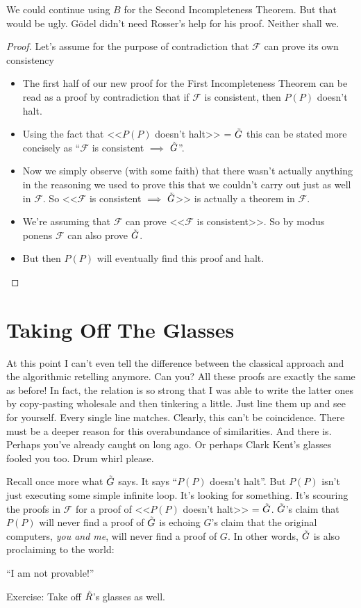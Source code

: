 \documentclass{article}
\newcommand{\F}{\ensuremath{\mathcal{F}}}
\newcommand{\iGoedel}{\ensuremath{\accentset{\scalebox{0.35}{$\infty$}}{G}}}
\newcommand{\iRosser}{\ensuremath{\accentset{\scalebox{0.35}{$\infty$}}{R}}}
\begin{document}
We could continue using $B$ for the Second Incompleteness Theorem. But that would be ugly. Gödel didn't need Rosser's help for his proof. Neither shall we.

\begin{proof}
Let's assume for the purpose of contradiction that $\F$ can prove its own consistency
\begin{itemize}
\item The first half of our new proof for the First Incompleteness Theorem can be read as a proof by contradiction that if $\F$ is consistent, then $P(P)$ doesn't halt.
\item Using the fact that <<$P(P)$ doesn't halt>> = $\iGoedel$ this can be stated more concisely as ``$\F$ is consistent $\implies$ $\iGoedel$''.
\item Now we simply observe (with some faith) that there wasn't actually anything in the reasoning we used to prove this that we couldn't carry out just as well in $\F$. So <<$\F$ is consistent $\implies$ $\iGoedel$>> is actually a theorem in $\F$.
\item We're assuming that $\F$ can prove <<$\F$ is consistent>>. So by modus ponens $\F$ can also prove $\iGoedel$.
\item But then $P(P)$ will eventually find this proof and halt. \lightning
\end{itemize}
\end{proof}

\section{Taking Off The Glasses}

At this point I can't even tell the difference between the classical approach and the algorithmic retelling anymore. Can you? All these proofs are exactly the same as before! In fact, the relation is so strong that I was able to write the latter ones by copy-pasting wholesale and then tinkering a little. Just line them up and see for yourself. Every single line matches. Clearly, this can't be coincidence. There must be a deeper reason for this overabundance of similarities. And there is. Perhaps you've already caught on long ago. Or perhaps Clark Kent's glasses fooled you too. Drum whirl please.

Recall once more what $\iGoedel$ says. It says ``$P(P)$ doesn't halt''. But $P(P)$ isn't just executing some simple infinite loop. It's looking for something. It's scouring the proofs in $\F$ for a proof of <<$P(P)$ doesn't halt>> = $\iGoedel$. $\iGoedel$'s claim that $P(P)$ will never find a proof of $\iGoedel$ is echoing $G$'s claim that the original computers, \textit{you and me}, will never find a proof of $G$. In other words, $\iGoedel$ is also proclaiming to the world:
\begin{center}
``I am not provable!''
\end{center}
Exercise: Take off $\iRosser$'s glasses as well.
\end{document}
